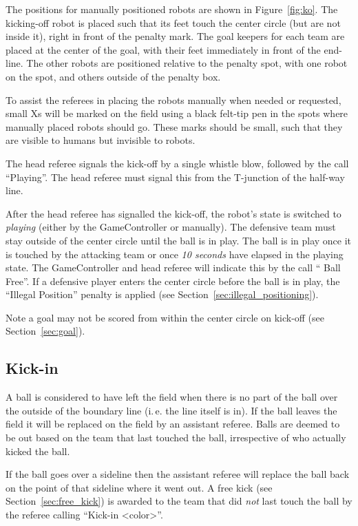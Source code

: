 \documentclass[12pt]{article}
\newcommand{\ie}{\mbox{i.\,e.}\xspace}
\newcommand{\cf}{see\xspace}
\newcommand{\KickOffBallFreeTime}{10 seconds\xspace}
\begin{document}
The positions for manually positioned robots are shown in Figure~\ref{fig:ko}. The kicking-off robot is placed such that its feet touch the center circle (but are not inside it), right in front of the penalty mark. The goal keepers for each team are placed at the center of the goal, with their feet immediately in front of the end-line.
The other robots are positioned relative to the penalty spot, with one robot on the spot, and others outside of the penalty box.

To assist the referees in placing the robots manually when needed or requested, small Xs will be marked on the field using a black felt-tip pen in the spots where manually placed robots should go.  These marks should be small, such that they are visible to humans but invisible to robots.

The head referee signals the kick-off by a single whistle blow, followed by the call ``Playing''. The head referee must signal this from the T-junction of the half-way line.

After the head referee has signalled the kick-off, the robot's state is switched to \emph{playing} (either by the GameController or manually).
The defensive team must stay outside of the center circle until the ball is in play.  The ball is in play once it is touched by the attacking team or once \emph{\KickOffBallFreeTime} have elapsed in the playing state.
The GameController and head referee will indicate this by the call `` Ball Free''.
If a defensive player enters the center circle before the ball is in play, the ``Illegal Position'' penalty is applied (\cf Section~\ref{sec:illegal_positioning}).

Note a goal may not be scored from within the center circle on kick-off (\cf Section~\ref{sec:goal}).

\subsection{Kick-in}
\label{sec:kick_in}

A ball is considered to have left the field when there is no part of the ball over the outside of the boundary line (\ie the line itself is in). If the ball leaves the field it will be replaced on the field by an assistant referee. Balls are deemed to be out based on the team that last touched the ball, irrespective of who actually kicked the ball.  

If the ball goes over a sideline then the assistant referee will replace the ball back on the point of that sideline where it went out. A free kick (\cf Section~\ref{sec:free_kick}) is awarded to the team that did \emph{not} last touch the ball by the referee calling ``Kick-in \textless color\textgreater''.
\end{document}
